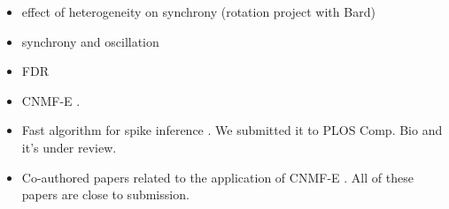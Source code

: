 \documentclass{article}
\begin{document}
\begin{itemize}
	\item effect of heterogeneity on synchrony (rotation project with Bard) \cite{Zhou2013}
	\item synchrony and oscillation \cite{Zhou2015}
	\item FDR \cite{Scott2015}
	\item CNMF-E \cite{Zhou2016}. 
	\item Fast algorithm for spike inference \cite{Friedrich2016}. We submitted it to PLOS Comp. Bio and it's under review. 
	\item Co-authored papers related to the application of CNMF-E \cite{Klaus2017,Jimenez2017,Rodriguez2017,Sun2017,Yu2017}. All of these papers are close to submission. 
\end{itemize}


\end{document}

